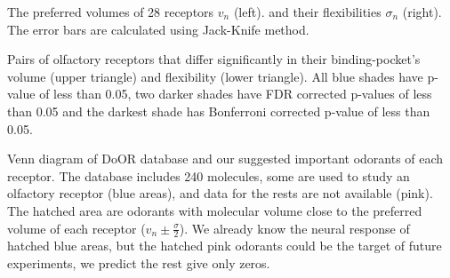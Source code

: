 \documentclass[a1paper,fontscale=0.5]{baposter} %
\newcommand{\numberofreceptors}{ 28 }
\begin{document}
\begin{poster}
{\begin{center}
\end{center}
The preferred volumes of \numberofreceptors receptors $v_n$ (left). 
and their flexibilities $\sigma_n$ (right). 
The error bars are calculated using Jack-Knife method. 

\begin{center}
\end{center}
Pairs of olfactory receptors that differ significantly in their binding-pocket's volume (upper triangle) and flexibility (lower triangle).
			All blue shades have p-value of less than 0.05, 
			two darker shades have FDR corrected p-values of less than 0.05 and the darkest shade has Bonferroni corrected p-value of less than 0.05.

\begin{center}
\end{center}	
Venn diagram of DoOR database and our suggested important odorants of each receptor.
The database includes 240 molecules, 
some are used to study an olfactory receptor (blue areas), 
and data for the rests are not available (pink).
The hatched area are odorants with molecular volume close to the preferred volume of each receptor
($v_n \pm \frac{\sigma}{2}$).
We already know the neural response of hatched blue areas, 
but the hatched pink odorants could be the target of future experiments, we predict the rest give only zeros.





}
\end{poster}
\end{document}
